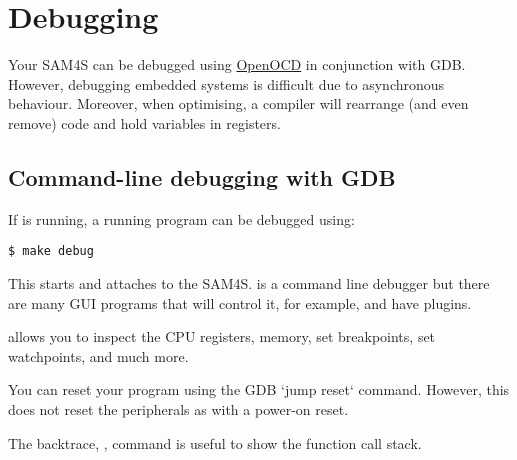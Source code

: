\chapter{Debugging}
\label{debugging}

Your SAM4S can be debugged using \hyperref[OpenOCD]{OpenOCD} in
conjunction with GDB.  However, debugging embedded systems is
difficult due to asynchronous behaviour.  Moreover, when optimising, a
compiler will rearrange (and even remove) code and hold variables in
registers.

\section{Command-line debugging with GDB}

If  is running, a running program can be debugged using:

\begin{verbatim}
$ make debug
\end{verbatim}

This starts  and attaches to the SAM4S.  is
a command line debugger but there are many GUI programs that will
control it, for example,  and  have
plugins.

 allows you to inspect the CPU registers, memory, set
breakpoints, set watchpoints, and much more.

You can reset your program using the GDB `jump reset` command.
However, this does not reset the peripherals as with a power-on reset.

The backtrace, , command is useful to show the function call
stack.


